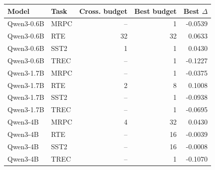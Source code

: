 \begin{tabular}{llrrr}
\toprule
Model & Task & Cross. budget & Best budget & Best $\Delta$ \\
\midrule
Qwen3-0.6B & MRPC & -- & 1 & -0.0539 \\
Qwen3-0.6B & RTE & 32 & 32 & 0.0633 \\
Qwen3-0.6B & SST2 & 1 & 1 & 0.0430 \\
Qwen3-0.6B & TREC & -- & 1 & -0.1227 \\
Qwen3-1.7B & MRPC & -- & 1 & -0.0375 \\
Qwen3-1.7B & RTE & 2 & 8 & 0.1008 \\
Qwen3-1.7B & SST2 & -- & 1 & -0.0938 \\
Qwen3-1.7B & TREC & -- & 1 & -0.0695 \\
Qwen3-4B & MRPC & 4 & 32 & 0.0430 \\
Qwen3-4B & RTE & -- & 16 & -0.0039 \\
Qwen3-4B & SST2 & -- & 16 & -0.0008 \\
Qwen3-4B & TREC & -- & 1 & -0.1070 \\
\bottomrule
\end{tabular}
